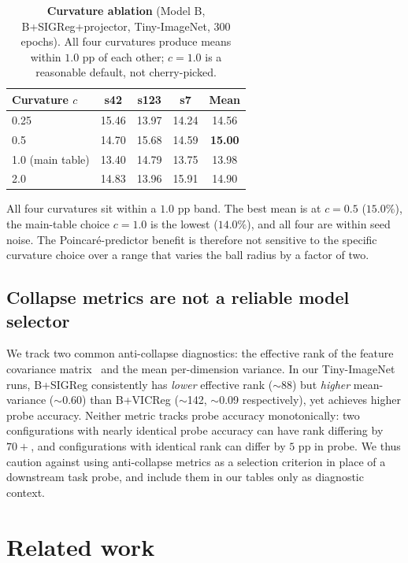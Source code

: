 \documentclass{article}
\begin{document}
\begin{table}[t]
  \centering
  \caption{\textbf{Curvature ablation} (Model B, B+SIGReg+projector, Tiny-ImageNet, 300 epochs). All four curvatures produce means within $1.0$ pp of each other; $c{=}1.0$ is a reasonable default, not cherry-picked.}
  \label{tab:curvature}
  \small
  \begin{tabular}{l c c c c}
    \toprule
    Curvature $c$ & s42 & s123 & s7 & Mean \\
    \midrule
    0.25             & 15.46 & 13.97 & 14.24 & 14.56 \\
    0.5              & 14.70 & 15.68 & 14.59 & \textbf{15.00} \\
    1.0 (main table) & 13.40 & 14.79 & 13.75 & 13.98 \\
    2.0              & 14.83 & 13.96 & 15.91 & 14.90 \\
    \bottomrule
  \end{tabular}
\end{table}

All four curvatures sit within a $1.0$ pp band. The best mean is at $c{=}0.5$ ($15.0\%$), the main-table choice $c{=}1.0$ is the lowest ($14.0\%$), and all four are within seed noise. The Poincar\'{e}-predictor benefit is therefore not sensitive to the specific curvature choice over a range that varies the ball radius by a factor of two.

\subsection{Collapse metrics are not a reliable model selector}
\label{sec:results:collapse}

We track two common anti-collapse diagnostics: the effective rank of the feature covariance matrix~\citep{roy2007effective} and the mean per-dimension variance. In our Tiny-ImageNet runs, B+SIGReg consistently has \emph{lower} effective rank ($\sim$88) but \emph{higher} mean-variance ($\sim$0.60) than B+VICReg ($\sim$142, $\sim$0.09 respectively), yet achieves higher probe accuracy. Neither metric tracks probe accuracy monotonically: two configurations with nearly identical probe accuracy can have rank differing by $70{+}$, and configurations with identical rank can differ by $5$ pp in probe. We thus caution against using anti-collapse metrics as a selection criterion in place of a downstream task probe, and include them in our tables only as diagnostic context.

\section{Related work}
\label{sec:related}
\end{document}
